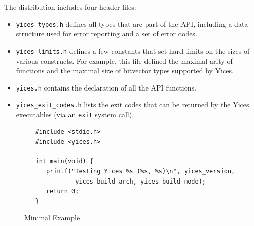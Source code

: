 \documentclass[11pt,twoside,fleqn,openright,titlepage]{cslreport}
\begin{document}
The distribution includes four header files:
\begin{itemize}
\item \texttt{yices\_types.h} defines all types that are part of the API,
including a data structure used for error reporting and a set of error codes.
\item \texttt{yices\_limits.h} defines a few constants that set hard
  limits on the sizes of various constructs. For example, this file
  defined the maximal arity of functions and the maximal size of
  bitvector types supported by Yices.
\item \texttt{yices.h} contains the declaration of all the API functions.
\item \texttt{yices\_exit\_codes.h} lists the exit codes that can be
  returned by the Yices executables (via an \texttt{exit} system call).
\end{itemize}

\begin{figure}
\begin{footnotesize}
\begin{verbatim}
   #include <stdio.h>
   #include <yices.h>

   int main(void) {
      printf("Testing Yices %s (%s, %s)\n", yices_version,
              yices_build_arch, yices_build_mode);
      return 0;
   }
\end{verbatim}
\end{footnotesize}
\caption{Minimal Example}
\label{minimal}
\end{figure}
\end{document}
